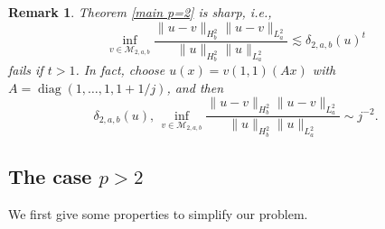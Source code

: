 \documentclass[11pt]{article}
\newtheorem{remark}[theorem]{Remark}
\DeclareMathOperator{\diag}{diag}
\numberwithin{equation}{section}
\begin{document}
\begin{remark}\label{rmk 3.1}
    Theorem \ref{main p=2} is sharp, i.e.,
    \[ \inf\limits_{v\in \mathcal{M}_{2,a,b}}\frac{\|u-v\|_{H^2_b}\|u-v\|_{L^2_a}}{\|u\|_{H^2_b}\|u\|_{L^2_a}} \lesssim \delta_{2,a,b}(u)^t \]
    fails if $t>1$. In fact, choose $u(x) = v(1,1)(Ax)$ with $A=\diag(1,\dots,1,1+1/j)$, and then
    \[ \delta_{2,a,b}(u),\,\inf\limits_{v\in \mathcal{M}_{2,a,b}}\frac{\|u-v\|_{H^2_b}\|u-v\|_{L^2_a}}{\|u\|_{H^2_b}\|u\|_{L^2_a}}\sim j^{-2}. \]
\end{remark}

\subsection{The case $p>2$}
We first give some properties to simplify our problem.
\end{document}
